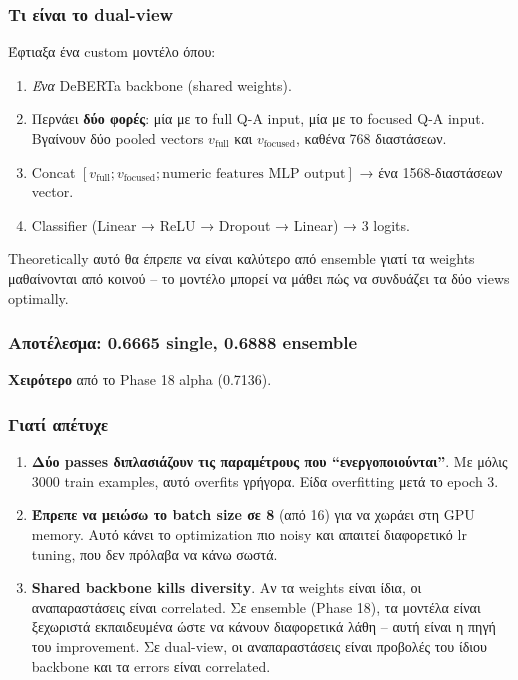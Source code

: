 \documentclass[12pt]{fphw}
\begin{document}
\subsubsection{Τι είναι το dual-view}

Έφτιαξα ένα custom μοντέλο όπου:

\begin{enumerate}
    \item \emph{Ένα} DeBERTa backbone (shared weights).
    \item Περνάει \textbf{δύο φορές}: μία με το full Q-A input, μία με το focused Q-A input. Βγαίνουν δύο pooled vectors $v_{\text{full}}$ και $v_{\text{focused}}$, καθένα 768 διαστάσεων.
    \item Concat $[v_{\text{full}}; v_{\text{focused}}; \text{numeric features MLP output}]$ → ένα 1568-διαστάσεων vector.
    \item Classifier (Linear → ReLU → Dropout → Linear) → 3 logits.
\end{enumerate}

Theoretically αυτό θα έπρεπε να είναι καλύτερο από ensemble γιατί τα weights μαθαίνονται από κοινού -- το μοντέλο μπορεί να μάθει πώς να συνδυάζει τα δύο views optimally.

\subsubsection{Αποτέλεσμα: 0.6665 single, 0.6888 ensemble}

\textbf{Χειρότερο} από το Phase 18 alpha (0.7136).

\subsubsection{Γιατί απέτυχε}

\begin{enumerate}
    \item \textbf{Δύο passes διπλασιάζουν τις παραμέτρους που ``ενεργοποιούνται''}. Με μόλις 3000 train examples, αυτό overfits γρήγορα. Είδα overfitting μετά το epoch 3.
    \item \textbf{Έπρεπε να μειώσω το batch size σε 8} (από 16) για να χωράει στη GPU memory. Αυτό κάνει το optimization πιο noisy και απαιτεί διαφορετικό lr tuning, που δεν πρόλαβα να κάνω σωστά.
    \item \textbf{Shared backbone kills diversity}. Αν τα weights είναι ίδια, οι αναπαραστάσεις είναι correlated. Σε ensemble (Phase 18), τα μοντέλα είναι ξεχωριστά εκπαιδευμένα ώστε να κάνουν διαφορετικά λάθη -- αυτή είναι η πηγή του improvement. Σε dual-view, οι αναπαραστάσεις είναι προβολές του ίδιου backbone και τα errors είναι correlated.
\end{enumerate}
\end{document}
